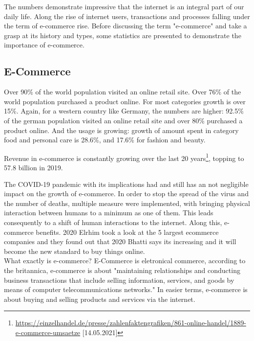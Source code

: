 The numbers demonstrate impressive that the internet is an integral part of our daily life.
Along the rise of internet users, transactions and processes falling under the term of e-commerce rise.
Before discussing the term "e-commerce" and take a grasp at its history and types, some statistics are presented to demonstrate the importance of e-commerce.


\subsection{E-Commerce}

Over 90\% of the world population visited an online retail site.
Over 76\% of the world population purchased a product online.
For most categories growth is over 15\%.
Again, for a western country like Germany, the numbers are higher:
92.5\% of the german population visited an online retail site and over 80\% purchased a product online.
And the usage is growing: growth of amount spent in category food and personal care is 28.6\%, and 17.6\% for fashion and beauty.

Revenue in e-commerce is constantly growing over the last 20 years\footnote{\url{https://einzelhandel.de/presse/zahlenfaktengrafiken/861-online-handel/1889-e-commerce-umsaetze} [14.05.2021]}, topping to 57.8 billion in 2019.


The COVID-19 pandemic with its implications had and still has an not negligible impact on the growth of e-commerce.
In order to stop the spread of the virus and the number of deaths, multiple measure were implemented, with bringing physical interaction between humans to a minimum as one of them.
This leads consequently to a shift of human interactions to the internet.
Along this, e-commerce benefits.
2020 Elrhim took a look at the 5 largest ecommerce companies and they found out that 
2020 Bhatti says its increasing and it will become the new standard to buy things online.
\\



What exactly is e-commerce?
E-Commerce is eletronical commerce, according to the britannica, e-commerce is about "maintaining relationships and conducting business transactions that include selling information, services, and goods by means of computer telecommunications networks."
In easier terms, e-commerce is about buying and selling products and services via the internet.


